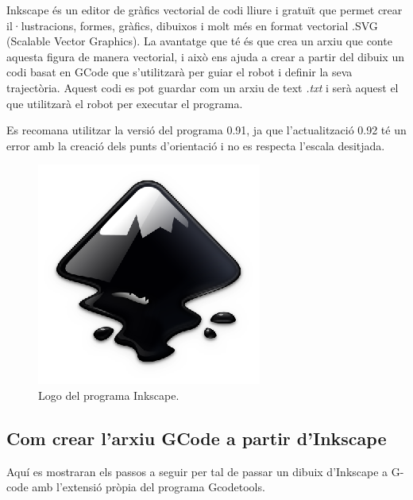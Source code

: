 Inkscape és un editor de gràfics vectorial de codi lliure i gratuït que permet crear il·lustracions, formes, gràfics, dibuixos i molt més en format vectorial .SVG (Scalable Vector Graphics). La avantatge que té és que crea un arxiu que conte aquesta figura de manera vectorial, i això ens ajuda a crear a partir del dibuix un codi basat en GCode que s'utilitzarà per guiar el robot i definir la seva trajectòria. Aquest codi es pot guardar com un arxiu de text \emph{.txt} i serà aquest el que utilitzarà el robot per executar el programa.

Es recomana utilitzar la versió del programa 0.91, ja que l'actualització 0.92 té un error amb la creació dels punts d'orientació i no es respecta l'escala desitjada. 

\begin{figure}[H]
	\centering
	\includegraphics[scale=1]{inkscape-logo.eps}
	\caption{Logo del programa Inkscape.}
	\label{fig:inkscapelogo}
\end{figure}

\subsection{Com crear l'arxiu GCode a partir d'Inkscape} Aquí es mostraran els passos a seguir per tal de passar un dibuix d'Inkscape a G-code amb l'extensió pròpia del programa Gcodetools.


